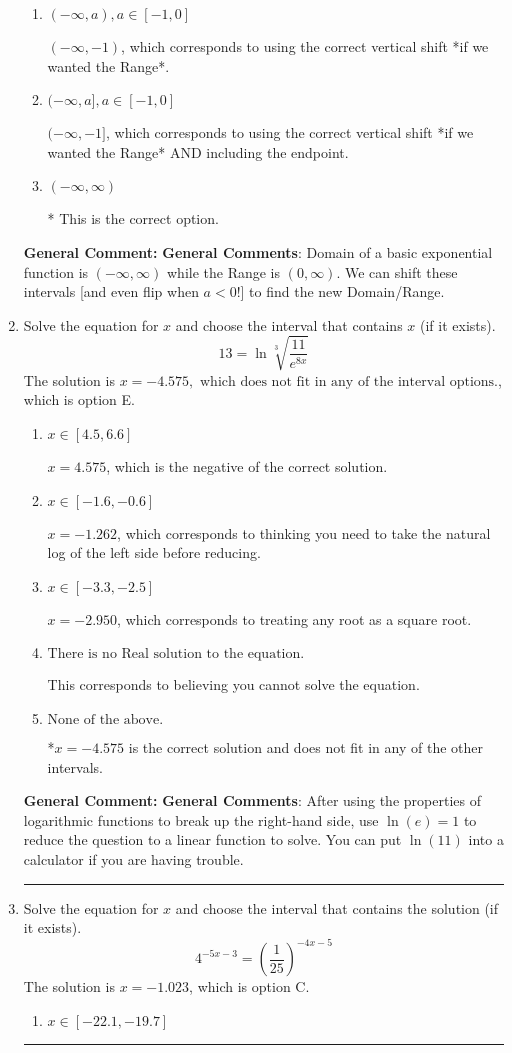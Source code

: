 \documentclass{extbook}[14pt]
\newcommand{\litem}[1]{\item #1

\rule{\textwidth}{0.4pt}}
\begin{document}
\begin{enumerate}
{\begin{enumerate}[label=\Alph*.]
$(1, \infty)$, which corresponds to using the negative vertical shift AND flipping the Range interval.
\item \( (-\infty, a), a \in [-1, 0] \)

$(-\infty, -1)$, which corresponds to using the correct vertical shift *if we wanted the Range*.
\item \( (-\infty, a], a \in [-1, 0] \)

$(-\infty, -1]$, which corresponds to using the correct vertical shift *if we wanted the Range* AND including the endpoint.
\item \( (-\infty, \infty) \)

* This is the correct option.
\end{enumerate}

\textbf{General Comment:} \textbf{General Comments}: Domain of a basic exponential function is $(-\infty, \infty)$ while the Range is $(0, \infty)$. We can shift these intervals [and even flip when $a<0$!] to find the new Domain/Range.
}
\litem{
 Solve the equation for $x$ and choose the interval that contains $x$ (if it exists).
\[  13 = \ln{\sqrt[3]{\frac{11}{e^{8x}}}} \]The solution is \( x = -4.575, \text{ which does not fit in any of the interval options.} \), which is option E.\begin{enumerate}[label=\Alph*.]
\item \( x \in [4.5, 6.6] \)

$x = 4.575$, which is the negative of the correct solution.
\item \( x \in [-1.6, -0.6] \)

$x = -1.262$, which corresponds to thinking you need to take the natural log of the left side before reducing.
\item \( x \in [-3.3, -2.5] \)

$x = -2.950$, which corresponds to treating any root as a square root.
\item \( \text{There is no Real solution to the equation.} \)

This corresponds to believing you cannot solve the equation.
\item \( \text{None of the above.} \)

*$x = -4.575$ is the correct solution and does not fit in any of the other intervals.
\end{enumerate}

\textbf{General Comment:} \textbf{General Comments}: After using the properties of logarithmic functions to break up the right-hand side, use $\ln(e) = 1$ to reduce the question to a linear function to solve. You can put $\ln(11)$ into a calculator if you are having trouble.
}
\litem{
Solve the equation for $x$ and choose the interval that contains the solution (if it exists).
\[ 4^{-5x-3} = \left(\frac{1}{25}\right)^{-4x-5} \]The solution is \( x = -1.023 \), which is option C.\begin{enumerate}[label=\Alph*.]
\item \( x \in [-22.1, -19.7] \)


\end{enumerate}}
\end{enumerate}
\end{document}
